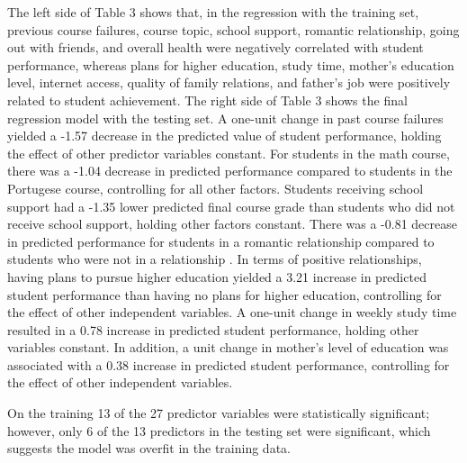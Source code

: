 The left side of Table 3 shows that, in the regression with the training set, 
previous course failures, course topic, school support, romantic relationship, 
going out with friends, and overall health were negatively correlated with 
student performance, whereas plans for higher education, study time, mother's
education level, internet access, quality of family relations, and father's 
job were positively related to student achievement. The right side of Table 3
shows the final regression model with the testing set. A one-unit change in 
past course failures yielded a -1.57 decrease in the predicted value of 
student performance, holding the effect of other predictor variables constant. 
For students in the math course, there was a -1.04 decrease in predicted 
performance compared to students in the Portugese course, controlling for all 
other factors. Students receiving school support had a -1.35 lower predicted 
final course grade than students who did not receive school support, holding
other factors constant. There was a -0.81 decrease in predicted performance 
for students in a romantic relationship compared to students who were not in 
a relationship . In terms of positive relationships, having plans to pursue 
higher education yielded a 3.21 increase in predicted student performance 
than having no plans for higher education, controlling for the effect of other
independent variables. A one-unit change in weekly study time resulted in a 
0.78 increase in predicted student performance, holding other variables 
constant. In addition, a unit change in mother's level of education was 
associated with a 0.38 increase in predicted student performance, controlling 
for the effect of other independent variables. 

On the training 13 of the 27 predictor variables were statistically 
significant; however, only 6 of the 13 predictors in the testing set were 
significant, which suggests the model was overfit in the training data. 
